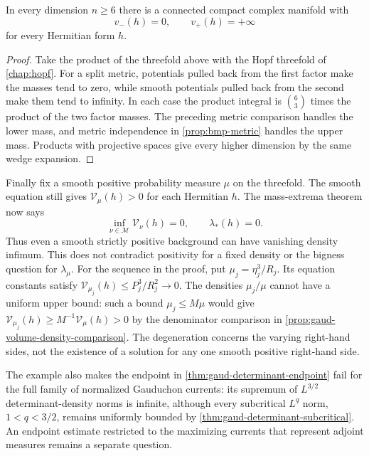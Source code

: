 \begin{corollary}\label{cor:both-mass-properties-fail}
In every dimension $n\geq6$ there is a connected compact complex manifold with
\[
 v_-(h)=0,\qquad v_+(h)=+\infty
\]
for every Hermitian form $h$.
\end{corollary}
\begin{proof}
Take the product of the threefold above with the Hopf threefold of \cref{chap:hopf}. For a split metric, potentials pulled back from the first factor make the masses tend to zero, while smooth potentials pulled back from the second make them tend to infinity. In each case the product integral is $\binom63$ times the product of the two factor masses. The preceding metric comparison handles the lower mass, and metric independence in \cref{prop:bmp-metric} handles the upper mass. Products with projective spaces give every higher dimension by the same wedge expansion.
\end{proof}

Finally fix a smooth positive probability measure $\mu$ on the threefold. The smooth equation still gives $\mathcal V_\mu(h)>0$ for each Hermitian $h$. The mass-extrema theorem now says
\[
 \inf_{\nu\in\mathscr M}\mathcal V_\nu(h)=0,
 \qquad \lambda_*(h)=0.
\]
Thus even a smooth strictly positive background can have vanishing density infimum. This does not contradict positivity for a fixed density or the bigness question for $\lambda_\mu$. For the sequence in the proof, put $\mu_j=\eta_j^3/R_j$. Its equation constants satisfy
$\mathcal V_{\mu_j}(h)\leq P_j^3/R_j^2\to0$.
The densities $\mu_j/\mu$ cannot have a uniform upper bound: such a bound $\mu_j\leq M\mu$ would give $\mathcal V_{\mu_j}(h)\geq M^{-1}\mathcal V_\mu(h)>0$ by the denominator comparison in \cref{prop:gaud-volume-density-comparison}. The degeneration concerns the varying right-hand sides, not the existence of a solution for any one smooth positive right-hand side.

The example also makes the endpoint in \cref{thm:gaud-determinant-endpoint} fail for the full family of normalized Gauduchon currents: its supremum of $L^{3/2}$ determinant-density norms is infinite, although every subcritical $L^q$ norm, $1<q<3/2$, remains uniformly bounded by \cref{thm:gaud-determinant-subcritical}. An endpoint estimate restricted to the maximizing currents that represent adjoint measures remains a separate question.
